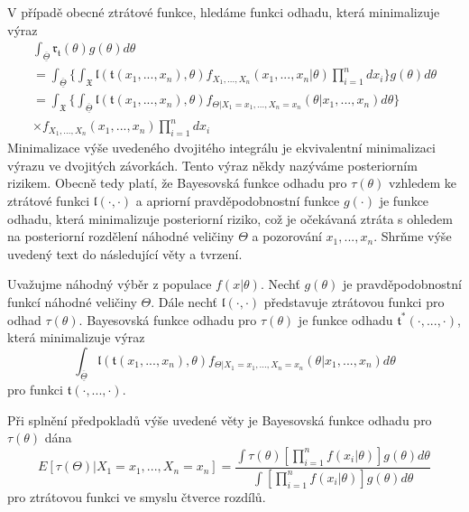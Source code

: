V případě obecné ztrátové funkce, hledáme funkci odhadu, která minimalizuje výraz
\begin{gather*}
\int_{\overline{\underline{\Theta}}}\mathfrak{r}_{\mathfrak{t}}(\theta)g(\theta)d \theta\\
= \int_{\overline{\underline{\Theta}}}\Big\{\int_{\mathfrak{X}}\mathfrak{l}(\mathfrak{t}(x_1, ..., x_n), \theta)f_{X_1, ..., X_n}(x_1, ..., x_n|\theta)\prod_{i = 1}^n d x_i \Big\}g(\theta) d\theta\\
= \int_{\mathfrak{X}}\Big\{\int_{\overline{\underline{\Theta}}}\mathfrak{l}(\mathfrak{t}(x_1, ..., x_n), \theta)f_{\Theta|X_1 = x_1, ..., X_n = x_n}(\theta|x_1, ..., x_n)d \theta \Big\}\\
\times f_{X_1, ..., X_n}(x_1, ..., x_n) \prod_{i = 1}^n d x_i
\end{gather*}
Minimalizace výše uvedeného dvojitého integrálu je ekvivalentní minimalizaci výrazu ve dvojitých závorkách. Tento výraz někdy nazýváme posteriorním rizikem. Obecně tedy platí, že Bayesovská funkce odhadu pro $\tau(\theta)$ vzhledem ke ztrátové funkci $\mathfrak{l}(\cdot, \cdot)$ a apriorní pravděpodobnostní funkce $g(\cdot)$ je funkce odhadu, která minimalizuje posteriorní riziko, což je očekávaná ztráta s ohledem na posteriorní rozdělení náhodné veličiny $\Theta$ a  pozorování $x_1, ..., x_n$. Shrňme výše uvedený text do následující věty a tvrzení.

\begin{theorem}
Uvažujme náhodný výběr z populace $f(x|\theta)$. Nechť $g(\theta)$ je pravděpodobnostní funkcí náhodné veličiny $\Theta$. Dále nechť $\mathfrak{l}(\cdot, \cdot)$ představuje ztrátovou funkci pro odhad $\tau(\theta)$. Bayesovská funkce odhadu pro $\tau(\theta)$ je funkce odhadu $\mathfrak{t}^*(\cdot, ..., \cdot)$, která minimalizuje výraz
\begin{equation*}
\int_{\overline{\underline{\Theta}}} \mathfrak{l}(\mathfrak{t}(x_1, ..., x_n), \theta) f_{\Theta|X_1 = x_1, ..., X_n = x_n}(\theta|x_1, ..., x_n)d \theta
\end{equation*}
pro funkci $\mathfrak{t}(\cdot, ..., \cdot)$.
\end{theorem}

\begin{corollary}
Při splnění předpokladů výše uvedené věty je Bayesovská funkce odhadu pro $\tau(\theta)$ dána
\begin{equation*}
E[\tau(\Theta)|X_1 = x_1, ..., X_n = x_n] = \frac{\int \tau(\theta)\left[\prod_{i = 1}^n f(x_i|\theta)\right]g(\theta)d \theta}{\int \left[\prod_{i = 1}^n f(x_i|\theta)\right] g(\theta)d \theta}
\end{equation*}
pro ztrátovou funkci ve smyslu čtverce rozdílů.
\end{corollary}

